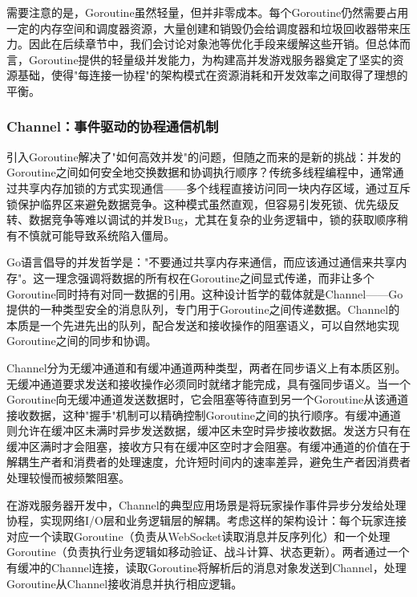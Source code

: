 需要注意的是，Goroutine虽然轻量，但并非零成本。每个Goroutine仍然需要占用一定的内存空间和调度器资源，大量创建和销毁仍会给调度器和垃圾回收器带来压力。因此在后续章节中，我们会讨论对象池等优化手段来缓解这些开销。但总体而言，Goroutine提供的轻量级并发能力，为构建高并发游戏服务器奠定了坚实的资源基础，使得"每连接一协程"的架构模式在资源消耗和开发效率之间取得了理想的平衡。



\subsubsection{Channel：事件驱动的协程通信机制}

引入Goroutine解决了"如何高效并发"的问题，但随之而来的是新的挑战：并发的Goroutine之间如何安全地交换数据和协调执行顺序？传统多线程编程中，通常通过共享内存加锁的方式实现通信——多个线程直接访问同一块内存区域，通过互斥锁保护临界区来避免数据竞争。这种模式虽然直观，但容易引发死锁、优先级反转、数据竞争等难以调试的并发Bug，尤其在复杂的业务逻辑中，锁的获取顺序稍有不慎就可能导致系统陷入僵局。

Go语言倡导的并发哲学是："不要通过共享内存来通信，而应该通过通信来共享内存"。这一理念强调将数据的所有权在Goroutine之间显式传递，而非让多个Goroutine同时持有对同一数据的引用。这种设计哲学的载体就是Channel——Go提供的一种类型安全的消息队列，专门用于Goroutine之间传递数据。Channel的本质是一个先进先出的队列，配合发送和接收操作的阻塞语义，可以自然地实现Goroutine之间的同步和协调。

Channel分为无缓冲通道和有缓冲通道两种类型，两者在同步语义上有本质区别。无缓冲通道要求发送和接收操作必须同时就绪才能完成，具有强同步语义。当一个Goroutine向无缓冲通道发送数据时，它会阻塞等待直到另一个Goroutine从该通道接收数据，这种"握手"机制可以精确控制Goroutine之间的执行顺序。有缓冲通道则允许在缓冲区未满时异步发送数据，缓冲区未空时异步接收数据。发送方只有在缓冲区满时才会阻塞，接收方只有在缓冲区空时才会阻塞。有缓冲通道的价值在于解耦生产者和消费者的处理速度，允许短时间内的速率差异，避免生产者因消费者处理较慢而被频繁阻塞。

在游戏服务器开发中，Channel的典型应用场景是将玩家操作事件异步分发给处理协程，实现网络I/O层和业务逻辑层的解耦。考虑这样的架构设计：每个玩家连接对应一个读取Goroutine（负责从WebSocket读取消息并反序列化）和一个处理Goroutine（负责执行业务逻辑如移动验证、战斗计算、状态更新）。两者通过一个有缓冲的Channel连接，读取Goroutine将解析后的消息对象发送到Channel，处理Goroutine从Channel接收消息并执行相应逻辑。

